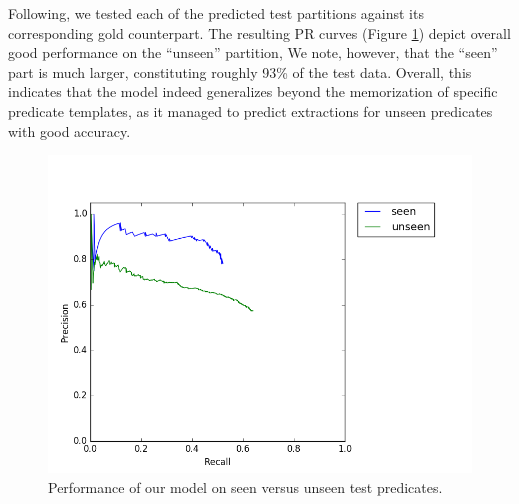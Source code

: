 Following, we tested each of the predicted test partitions against its corresponding gold
counterpart.
The resulting PR curves (Figure \ref{fig:unseen}) depict overall good performance on the ``unseen'' partition,
We note, however, that the ``seen'' part is much larger, constituting roughly 93\% of the test data.
Overall, this indicates that the model indeed generalizes beyond the memorization of specific predicate templates, as
it managed to predict extractions for unseen predicates with good accuracy.

\begin{figure}[tb!]

  \centering
    \includegraphics[width=1\columnwidth]{figures/uniq_test_pr}

  \caption{Performance of our model on seen versus unseen test predicates.}
  \label{fig:unseen}

\end{figure}


